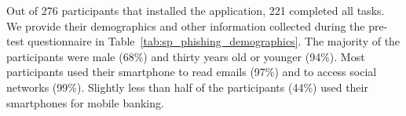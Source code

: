 Out of 276 participants that installed the application, 221 completed all
tasks. We provide their demographics and other information collected during the
pre-test questionnaire in Table~\ref{tab:sp_phishing_demographics}. The majority of the
participants were male (68\%) and thirty years old or younger (94\%). Most participants
used their smartphone to read emails (97\%) and to access social networks (99\%).
Slightly less than half of the participants (44\%) used their smartphones for
mobile banking.

\begin{table}[!ht]
    \begin{center}
    \end{center}
    \caption[Success rate of the phishing attack]{Success rate of the phishing attack.}
    \label{tab:sp_phishing_primary}
\end{table}

